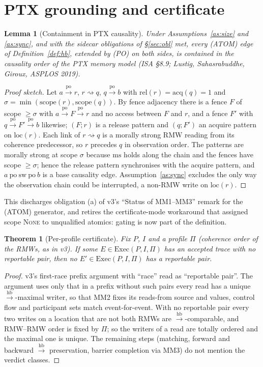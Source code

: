 \documentclass[11pt]{article}
\newtheorem{lemma}{Lemma}
\newtheorem{theorem}{Theorem}
\theoremstyle{remark}
\newcommand{\PO}{\xrightarrow{\mathrm{po}}}
\newcommand{\HB}{\xrightarrow{\mathrm{hb}}}
\newcommand{\loc}{\mathrm{loc}}
\newcommand{\scope}{\mathrm{scope}}
\newcommand{\rel}{\mathrm{rel}}
\newcommand{\acq}{\mathrm{acq}}
\newcommand{\ms}{\mathrm{ms}}
\newcommand{\chain}{\rightsquigarrow}
\begin{document}
\section{PTX grounding and certificate}

\begin{lemma}[Containment in PTX causality]\label{lem:ptx}
Under Assumptions~\ref{as:size} and \ref{as:sync}, and with the sidecar
obligations of \S\ref{sec:obl} met, every (ATOM) edge of
Definition~\ref{def:hb}, extended by (PO) on both sides, is contained in the
causality order of the PTX memory model (ISA \S8.9; Lustig, Sahasrabuddhe,
Giroux, ASPLOS 2019).
\end{lemma}
\begin{proof}[Proof sketch]
Let $a\PO r$, $r\chain q$, $q\PO b$ with $\rel(r)=\acq(q)=1$ and
$\sigma=\min(\scope(r),\scope(q))$. By fence adjacency there is a fence $F$ of
scope $\ge\sigma$ with $a\PO F\PO r$ and no access between $F$ and $r$, and a
fence $F'$ with $q\PO F'\PO b$ likewise; $(F;r)$ is a release pattern and
$(q;F')$ an acquire pattern on $\loc(r)$. Each link of $r\chain q$ is a
morally strong RMW reading from its coherence predecessor, so $r$ precedes $q$
in observation order. The patterns are morally strong at scope $\sigma$ because
$\ms$ holds along the chain and the fences have scope $\ge\sigma$; hence the
release pattern synchronises with the acquire pattern, and
$a\ \mathrm{po}\ \mathrm{sw}\ \mathrm{po}\ b$ is a base causality edge.
Assumption~\ref{as:sync} excludes the only way the observation chain could be
interrupted, a non-RMW write on $\loc(r)$.
\end{proof}

This discharges obligation (a) of v3's ``Status of MM1--MM3'' remark for the
(ATOM) generator, and retires the certificate-mode workaround that assigned
scope \textsc{None} to unqualified atomics: gating is now part of the
definition.

\begin{theorem}[Per-profile certificate]\label{thm:cert}
Fix $P$, $I$ and a profile $\Pi$ (coherence order of the RMWs, as in v3). If
some $E\in\mathrm{Exec}(P,I,\Pi)$ has an accepted trace with no reportable
pair, then no $E'\in\mathrm{Exec}(P,I,\Pi)$ has a reportable pair.
\end{theorem}
\begin{proof}
v3's first-race prefix argument with ``race'' read as ``reportable pair''.
The argument uses only that in a prefix without such pairs every read has a
unique $\HB$-maximal writer, so that MM2 fixes its reads-from source and
values, control flow and participant sets match event-for-event. With no
reportable pair every two writes on a location that are not both RMWs are
$\HB$-comparable, and RMW--RMW order is fixed by $\Pi$; so the writers of a
read are totally ordered and the maximal one is unique. The remaining steps
(matching, forward and backward $\HB$ preservation, barrier completion via
MM3) do not mention the verdict classes.
\end{proof}
\end{document}
